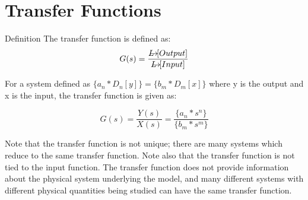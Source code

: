 \documentclass{../templates/topic}
\begin{document}
\chapter{Transfer Functions}

\begin{section}{Definition}
	The transfer function is defined as:
	\begin{equation}
		G(s) = \frac{\laplace[Output]}{\laplace[Input]}
	\end{equation}
	
	For a system defined as $\{a_{n}*D_{n}[y] \} = \{b_{m}*D_{m}[x] \}$ where y is the output and x is the input, the transfer function is given as:
	
	\begin{equation}
		G(s) = \frac{Y(s)}{X(s)} = \frac{\{a_{n}*s^{n}\}}{\{b_{m}*s^{m}\}}
	\end{equation}
	
	Note that the transfer function is not unique; there are many systems which reduce to the same transfer function.
	Note also that the transfer function is not tied to the input function.
	The transfer function does not provide information about the physical system underlying the model, and many different systems with different physical quantities being studied can have the same transfer function.
	
\end{section}
\end{document}
